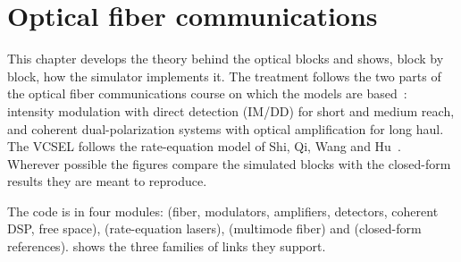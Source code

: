 \chapter{Optical fiber communications}\label{ch:optical}

This chapter develops the theory behind the optical blocks and shows, block by block, how the
simulator implements it. The treatment follows the two parts of the optical fiber
communications course on which the models are based~\cite{ofcnotes}: intensity modulation with
direct detection (IM/DD) for short and medium reach, and coherent dual-polarization systems
with optical amplification for long haul. The VCSEL follows the rate-equation model of Shi,
Qi, Wang and Hu~\cite{shi2009}. Wherever possible the figures compare the simulated blocks
with the closed-form results they are meant to reproduce.

The code is in four modules:  (fiber, modulators, amplifiers, detectors,
coherent DSP, free space),  (rate-equation lasers), 
(multimode fiber) and  (closed-form references). 
shows the three families of links they support.

